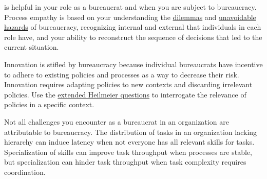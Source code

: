 

\iftoggle{glossarysubstitutionworks}{\Gls{process empathy}}{Process empathy} 
is helpful in your role as a bureaucrat and when you are subject to bureaucracy. 
Process empathy is based on your understanding the \hyperref[sec:dilemma-trilemma]{dilemmas} and \hyperref[sec:unavoidable-hazards]{unavoidable hazards} of bureaucracy, recognizing internal 
\iftoggle{glossarysubstitutionworks}{\glspl{motive}}{motives} and external 
\iftoggle{glossarysubstitutionworks}{\glspl{incentive}}{incentives}
 that individuals in each role have, and your ability to reconstruct the sequence of decisions that led to the current situation. 


Innovation is stifled by bureaucracy%
\iftoggle{haspagenumbers}{ (see page~\pageref{sec:innovation})}{} because individual bureaucrats have incentive to adhere to existing policies and processes as a way to decrease their risk. Innovation requires adapting policies to new contexts and discarding irrelevant policies. 
Use the \hyperref[sec:extending-Heilmeier]{extended Heilmeier questions}%
\iftoggle{haspagenumbers}{ (see page~\pageref{sec:extending-Heilmeier})}{} to interrogate the relevance of policies in a specific context.


Not all challenges you encounter as a bureaucrat in an organization are attributable to bureaucracy. The distribution of tasks in an organization lacking hierarchy can induce latency when not everyone has all relevant skills for tasks. Specialization of skills can improve task throughput when processes are stable, but specialization can hinder task throughput when task complexity requires coordination.

